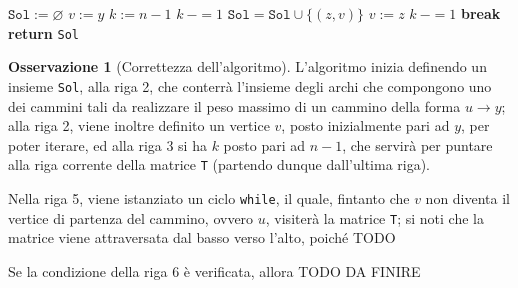 \documentclass[14pt]{extreport}
\theoremstyle{definition}
\theoremstyle{definition}
\newtheorem{remark}{Osservazione}[subsection]
\begin{document}
\begin{algorithm}[H]
    \caption{
        Dato un grafo $G$ diretto aciclico, pesato attraverso $w$ con pesi sia positivi che negativi, due suoi nodi $u, v \in V(G)$, e la matrice costruita attraverso la funzione \texttt{maxWeightPaths} dell'\cref{maxWeightPaths}, l'algoritmo restituisce un cammino, della forma $u \rightarrow y$, che realizza tale peso massimo.\\
        \textbf{Input}: $G$ grafo diretto aciclico; $w$ funzione dei pesi degli archi; $u, y \in V(G)$ due vertici di $G$; \texttt{T} matrice prodotta precedentemente.\\
        \textbf{Output}: cammino tale da massimizzare il peso di un cammino $u \rightarrow y$.
    }

    \begin{algorithmic}[1]
            \State $\texttt{Sol} := \varnothing$
            \State $v := y$
            \State $k := n -1$
                    \State $k \ -= 1$
                \Else
                     
                            \State $\texttt{Sol} = \texttt{Sol} \cup \{(z, v)\}$
                            \State $v := z$
                            \State $k \ -= 1$
                            \State \textbf{break}
                        \EndIf
                    \EndFor
                \EndIf
            \EndWhile
            \State \textbf{return} \texttt{Sol}
        \EndFunction
    \end{algorithmic}
\end{algorithm}

\begin{remark}[Correttezza dell'algoritmo]
    L'algoritmo inizia definendo un insieme \texttt{Sol}, alla riga 2, che conterrà l'insieme degli archi che compongono uno dei cammini tali da realizzare il peso massimo di un cammino della forma $u \rightarrow y$; alla riga 2, viene inoltre definito un vertice $v$, posto inizialmente pari ad $y$, per poter iterare, ed alla riga 3 si ha $k$ posto pari ad $n - 1$, che servirà per puntare alla riga corrente della matrice \texttt{T} (partendo dunque dall'ultima riga).

    Nella riga 5, viene istanziato un ciclo \texttt{while}, il quale, fintanto che $v$ non diventa il vertice di partenza del cammino, ovvero $u$, visiterà la matrice \texttt{T}; si noti che la matrice viene attraversata dal basso verso l'alto, poiché TODO

    Se la condizione della riga 6 è verificata, allora TODO DA FINIRE
\end{remark}
\end{document}
